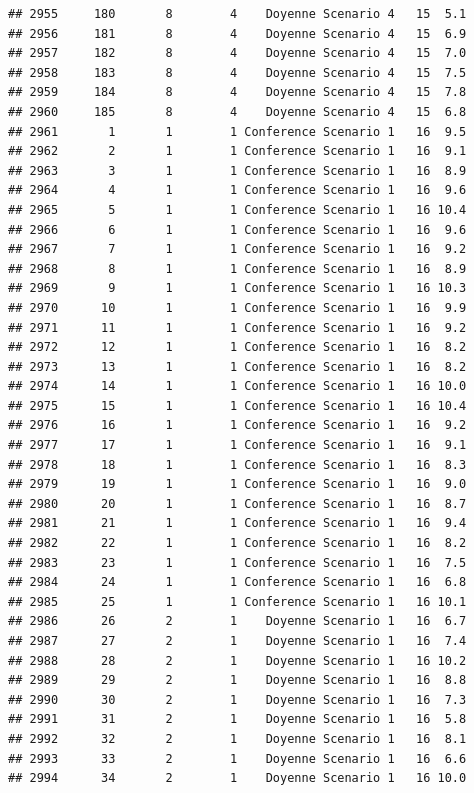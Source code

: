\documentclass[
]{article}
\begin{document}
\begin{verbatim}
## 2955     180       8        4    Doyenne Scenario 4   15  5.1
## 2956     181       8        4    Doyenne Scenario 4   15  6.9
## 2957     182       8        4    Doyenne Scenario 4   15  7.0
## 2958     183       8        4    Doyenne Scenario 4   15  7.5
## 2959     184       8        4    Doyenne Scenario 4   15  7.8
## 2960     185       8        4    Doyenne Scenario 4   15  6.8
## 2961       1       1        1 Conference Scenario 1   16  9.5
## 2962       2       1        1 Conference Scenario 1   16  9.1
## 2963       3       1        1 Conference Scenario 1   16  8.9
## 2964       4       1        1 Conference Scenario 1   16  9.6
## 2965       5       1        1 Conference Scenario 1   16 10.4
## 2966       6       1        1 Conference Scenario 1   16  9.6
## 2967       7       1        1 Conference Scenario 1   16  9.2
## 2968       8       1        1 Conference Scenario 1   16  8.9
## 2969       9       1        1 Conference Scenario 1   16 10.3
## 2970      10       1        1 Conference Scenario 1   16  9.9
## 2971      11       1        1 Conference Scenario 1   16  9.2
## 2972      12       1        1 Conference Scenario 1   16  8.2
## 2973      13       1        1 Conference Scenario 1   16  8.2
## 2974      14       1        1 Conference Scenario 1   16 10.0
## 2975      15       1        1 Conference Scenario 1   16 10.4
## 2976      16       1        1 Conference Scenario 1   16  9.2
## 2977      17       1        1 Conference Scenario 1   16  9.1
## 2978      18       1        1 Conference Scenario 1   16  8.3
## 2979      19       1        1 Conference Scenario 1   16  9.0
## 2980      20       1        1 Conference Scenario 1   16  8.7
## 2981      21       1        1 Conference Scenario 1   16  9.4
## 2982      22       1        1 Conference Scenario 1   16  8.2
## 2983      23       1        1 Conference Scenario 1   16  7.5
## 2984      24       1        1 Conference Scenario 1   16  6.8
## 2985      25       1        1 Conference Scenario 1   16 10.1
## 2986      26       2        1    Doyenne Scenario 1   16  6.7
## 2987      27       2        1    Doyenne Scenario 1   16  7.4
## 2988      28       2        1    Doyenne Scenario 1   16 10.2
## 2989      29       2        1    Doyenne Scenario 1   16  8.8
## 2990      30       2        1    Doyenne Scenario 1   16  7.3
## 2991      31       2        1    Doyenne Scenario 1   16  5.8
## 2992      32       2        1    Doyenne Scenario 1   16  8.1
## 2993      33       2        1    Doyenne Scenario 1   16  6.6
## 2994      34       2        1    Doyenne Scenario 1   16 10.0

\end{verbatim}
\end{document}

